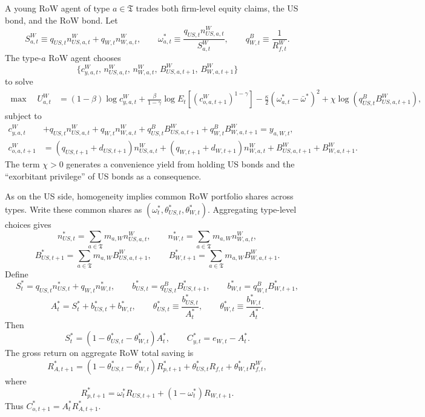 \documentclass{article}
\begin{document}
A young RoW agent of type $a\in\mathfrak T$ trades both firm-level equity claims, the US bond, and the RoW bond. Let
\[
S_{a,t}^{W}\equiv q_{US,t}n^{W}_{US,a,t}+q_{W,t}n^{W}_{W,a,t},
\qquad
\omega^*_{a,t}\equiv\frac{q_{US,t}n^{W}_{US,a,t}}{S^{W}_{a,t}},
\qquad
q^B_{W,t}\equiv\frac{1}{R_{f,t}^W}.
\]
The type-$a$ RoW agent chooses
\[
\{c^W_{y,a,t},\,n^W_{US,a,t},\,n^W_{W,a,t},\,B^W_{US,a,t+1},\,B^W_{W,a,t+1}\}
\]
to solve
\begin{align*}
\max\quad U_{a,t}^W
&=
(1-\beta)\log c^W_{y,a,t}
+\frac{\beta}{1-\gamma}\log E_t\!\left[(c^W_{o,a,t+1})^{1-\gamma}\right]
-\frac{\kappa}{2}(\omega^*_{a,t}-\bar\omega^*)^2
+\chi\log\!\left(q^B_{US,t}B^W_{US,a,t+1}\right),
\end{align*}
subject to
\begin{align*}
c^W_{y,a,t}
&+q_{US,t}n^W_{US,a,t}+q_{W,t}n^W_{W,a,t}
+q^B_{US,t}B^W_{US,a,t+1}+q^B_{W,t}B^W_{W,a,t+1}
= y_{a,W,t},\\
c^W_{o,a,t+1}
&=
(q_{US,t+1}+d_{US,t+1})n^W_{US,a,t}
+(q_{W,t+1}+d_{W,t+1})n^W_{W,a,t}
+B^W_{US,a,t+1}+B^W_{W,a,t+1}.
\end{align*}
The term $\chi>0$ generates a convenience yield from holding US bonds and the ``exorbitant privilege'' of US bonds as a consequence.

As on the US side, homogeneity implies common RoW portfolio shares across types. Write these common shares as $(\omega_t^*,\theta_{US,t}^*,\theta_{W,t}^*)$. Aggregating type-level choices gives
\[
n^*_{US,t}=\sum_{a\in\mathfrak T}m_{a,W}n^W_{US,a,t},
\qquad
n^*_{W,t}=\sum_{a\in\mathfrak T}m_{a,W}n^W_{W,a,t},
\]
\[
B^*_{US,t+1}=\sum_{a\in\mathfrak T}m_{a,W}B^W_{US,a,t+1},
\qquad
B^*_{W,t+1}=\sum_{a\in\mathfrak T}m_{a,W}B^W_{W,a,t+1}.
\]
Define
\[
S_t^*=q_{US,t}n^*_{US,t}+q_{W,t}n^*_{W,t},
\qquad
b_{US,t}^*=q^B_{US,t}B^*_{US,t+1},
\qquad
b_{W,t}^*=q^B_{W,t}B^*_{W,t+1},
\]
\[
A_t^*=S_t^*+b_{US,t}^*+b_{W,t}^*,
\qquad
\theta_{US,t}^*\equiv\frac{b_{US,t}^*}{A_t^*},
\qquad
\theta_{W,t}^*\equiv\frac{b_{W,t}^*}{A_t^*}.
\]
Then
\[
S_t^*=(1-\theta_{US,t}^*-\theta_{W,t}^*)A_t^*,
\qquad
C^*_{y,t}=e_{W,t}-A_t^*.
\]
The gross return on aggregate RoW total saving is
\[
R_{A,t+1}^*
=
(1-\theta_{US,t}^*-\theta_{W,t}^*)R_{p,t+1}^*
+\theta_{US,t}^*R_{f,t}
+\theta_{W,t}^*R_{f,t}^W,
\]
where
\[
R_{p,t+1}^*=\omega_t^*R_{US,t+1}+(1-\omega_t^*)R_{W,t+1}.
\]
Thus $C^*_{o,t+1}=A_t^*R_{A,t+1}^*$.
\end{document}
